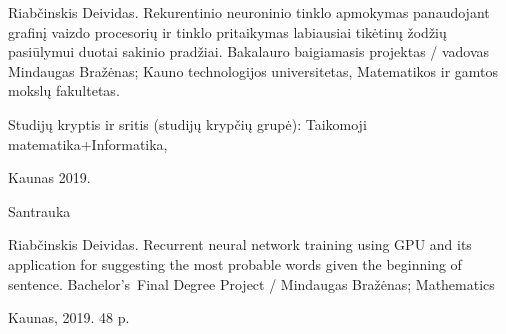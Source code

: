 Riabčinskis Deividas. Rekurentinio neuroninio tinklo apmokymas panaudojant grafinį vaizdo procesorių ir tinklo pritaikymas labiausiai tikėtinų žodžių pasiūlymui duotai sakinio pradžiai. Bakalauro baigiamasis projektas / vadovas Mindaugas Bražėnas; Kauno technologijos universitetas, Matematikos ir gamtos mokslų fakultetas.

Studijų kryptis ir sritis (studijų krypčių grupė): Taikomoji matematika+Informatika, %

Kaunas 2019. %

Santrauka


Riabčinskis Deividas. Recurrent neural network training using GPU and its application for suggesting the most probable words given the beginning of sentence. Bachelor's Final Degree Project / Mindaugas Bražėnas; Mathematics%


Kaunas, 2019. 48 p.
